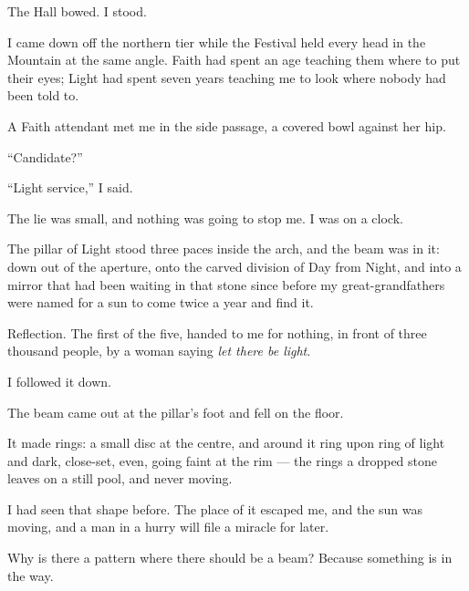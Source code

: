 
The Hall bowed. I stood.\par

I came down off the northern tier while the Festival held every head in the Mountain at the same angle. Faith had spent an age teaching them where to put their eyes; Light had spent seven years teaching me to look where nobody had been told to.\par

A Faith attendant met me in the side passage, a covered bowl against her hip.\par

``Candidate?''\par

``Light service,'' I said.\par

The lie was small, and nothing was going to stop me. I was on a clock.\par

\ornament

The pillar of Light stood three paces inside the arch, and the beam was in it: down out of the aperture, onto the carved division of Day from Night, and into a mirror that had been waiting in that stone since before my great-grandfathers were named for a sun to come twice a year and find it.\par

Reflection. The first of the five, handed to me for nothing, in front of three thousand people, by a woman saying \textit{let there be light}.\par

I followed it down.\par

\ornament

The beam came out at the pillar's foot and fell on the floor.\par

It made rings: a small disc at the centre, and around it ring upon ring of light and dark, close-set, even, going faint at the rim --- the rings a dropped stone leaves on a still pool, and never moving.\par

I had seen that shape before. The place of it escaped me, and the sun was moving, and a man in a hurry will file a miracle for later.\par

Why is there a pattern where there should be a beam? Because something is in the way.\par

